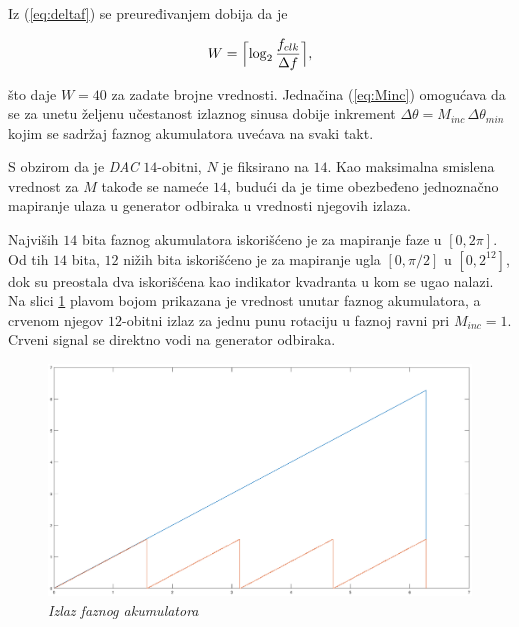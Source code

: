 \documentclass[conference]{IEEEtran}
\DeclarePairedDelimiter{\ceil}{\lceil}{\rceil}
\begin{document}
Iz (\ref{eq:deltaf}) se preuređivanjem dobija da je 

\begin{equation}
W = \ceil[\Big]{\log_2{\frac{f_{clk}}{\Delta f}}} ,
\end{equation}

\noindent što daje $W = 40$ za zadate brojne vrednosti. 
Jednačina (\ref{eq:Minc}) omogućava da se za unetu željenu učestanost izlaznog sinusa dobije inkrement $\Delta \theta=M_{inc}\,\Delta \theta_{min}$ kojim se sadržaj faznog akumulatora uvećava na svaki takt. 

S obzirom da je \textsl{DAC} $14$-obitni, $N$ je fiksirano na $14$. Kao maksimalna smislena vrednost za $M$ takođe se nameće $14$, budući da je time obezbeđeno jednoznačno mapiranje ulaza u generator odbiraka u vrednosti njegovih izlaza.

Najviših $14$ bita faznog akumulatora iskorišćeno je za mapiranje faze u $[0, 2\pi]$. Od tih $14$ bita, $12$ nižih bita iskorišćeno je za mapiranje ugla $[0, \pi/2]$ u $[0, 2^{12}]$, dok su preostala dva iskorišćena kao indikator kvadranta u kom se ugao nalazi. Na slici \ref{slika:fazniAcc} plavom bojom prikazana je vrednost unutar faznog akumulatora, a crvenom njegov $12$-obitni izlaz za jednu punu rotaciju u faznoj ravni pri $M_{inc}=1$. Crveni signal se direktno vodi na generator odbiraka.

\begin{figure}[h]
	\centering
	\includegraphics[scale=0.16]{./slike/izlazFaznogAkumulatora.eps}
	\caption{\textsl{Izlaz faznog akumulatora}}
	\label{slika:fazniAcc}
\end{figure}

\end{document}
